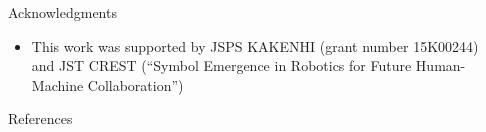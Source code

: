 \documentclass[final,hyperref={pdfpagelabels=false}]{beamer}
\begin{document}
\begin{frame}[t]
\begin{columns}[t]
\begin{column}{.3\textwidth}
    \begin{block}{Acknowledgments}
    \begin{itemize}
    \item This work was supported by JSPS KAKENHI (grant number 15K00244) and
JST CREST (“Symbol Emergence in Robotics for Future Human-Machine
Collaboration”)
    \end{itemize}
    \end{block}

    \begin{block}{References}
      \nocite{*} %
      \linespread{0.928}\selectfont
      \footnotesize{
      }
    \end{block}

  \end{column} %

  \begin{column}{.02\textwidth}\end{column} %

\end{columns} %

\end{frame} %
\end{document}
